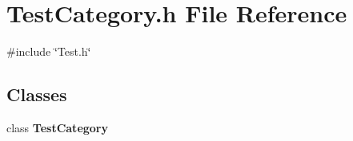 \section{Test\+Category.\+h File Reference}
\label{TestCategory_8h}
{\ttfamily \#include \char`\"{}Test.\+h\char`\"{}}\newline
\subsection*{Classes}
\begin{DoxyCompactItemize}
\item 
class \textbf{ Test\+Category}
\end{DoxyCompactItemize}
